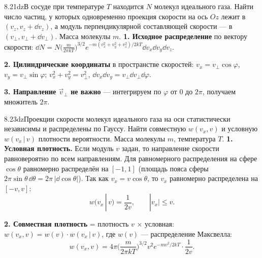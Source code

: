 \begin{problem}{8.21}{dz}{В сосуде при температуре $T$ находится $N$ молекул идеального газа. Найти число частиц, у которых одновременно проекция
скорости на ось $Oz$ лежит в $(v_z,v_z+\dd v_z)$, а модуль перпендикулярной составляющей скорости — в $(v_\perp,v_\perp+\dd v_\perp)$. Масса молекулы $m$.}
\textbf{1. Исходное распределение} по вектору скорости:
$\dd N=N\big(\frac m{2\pi kT}\big)^{3/2}e^{-m(v_x^2+v_y^2+v_z^2)/2kT}\dd v_x\dd v_y\dd v_z$.

\textbf{2. Цилиндрические координаты} в пространстве скоростей: $v_x=v_\perp\cos\varphi$, $v_y=v_\perp\sin\varphi$;
$v_x^2+v_y^2=v_\perp^2$, $\dd v_x\dd v_y=v_\perp\dd v_\perp\dd\varphi$.

\textbf{3. Направление $\vec v_\perp$ не важно} — интегрируем по $\varphi$ от 0 до $2\pi$, получаем множитель $2\pi$.
\end{problem}

\begin{problem}{8.23}{dz}{Проекции скорости молекул идеального газа на оси статистически независимы и распределены по Гауссу. Найти совместную
$w(v_x,v)$ и условную $w(v_x\,|\,v)$ плотности вероятности. Масса молекулы $m$, температура $T$.}
\textbf{1. Условная плотность.} Если модуль $v$ задан, то направление скорости равновероятно по всем направлениям.
Для равномерного распределения на сфере $\cos\theta$ равномерно распределён на $[-1,1]$
(площадь пояса сферы $2\pi\sin\theta\,\dd\theta=2\pi\,|\dd\cos\theta|$). Так как $v_x=v\cos\theta$, то $v_x$ равномерно распределена на $[-v,v]$:
\[w(v_x\,|\,v)=\frac{1}{2v},\qquad|v_x|\le v.\]

\textbf{2. Совместная плотность} = плотность $v$ $\times$ условная: $w(v_x,v)=w(v)\cdot w(v_x\,|\,v)$, где $w(v)$ — распределение Максвелла:
\[w(v_x,v)=4\pi\Big(\frac m{2\pi kT}\Big)^{3/2}v^2e^{-mv^2/2kT}\cdot\frac1{2v}.\]
\end{problem}
